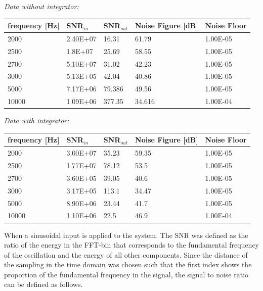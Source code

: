 \textit{Data without integrator:}
\begin{center}
\begin{tabular}{|m{3cm}|m{3cm}|m{2.5cm}|m{3.2cm}|m{2cm}|} 
\hline
frequency [Hz]& SNR$_{in}$ & SNR$_{out}$ & Noise Figure [dB] & Noise Floor \\ 
\hline \hline
2000 & 2.40E+07 & 16.31 & \cellcolor{blue!25}61.79 & 1.00E-05 \\ 
\hline
2500 & 1.8E+07 & 25.69 & \cellcolor{blue!25}58.55 & 1.00E-05 \\ 
\hline
2700 & 5.10E+07 & 31.02 & \cellcolor{blue!25}42.23 & 1.00E-05 \\ 
\hline
3000 & 5.13E+05 & 42.04 & \cellcolor{blue!25}40.86 & 1.00E-05 \\ 
\hline
5000 & 7.17E+06 & 79.386 & \cellcolor{blue!25}49.56 & 1.00E-05 \\ 
\hline
10000 & 1.09E+06 & 377.35 & \cellcolor{red!25}34.616 & 1.00E-04 \\ 
\hline

\end{tabular}
\end{center}

\textit{Data with integrator:}
\begin{center}
\begin{tabular}{|m{3cm}|m{3cm}|m{2.5cm}|m{3.2cm}|m{2cm}|} 
\hline
frequency [Hz]& SNR$_{in}$ & SNR$_{out}$ & Noise Figure [dB] & Noise Floor \\ 
\hline \hline
2000 & 3.00E+07 & 35.23 & \cellcolor{blue!25}59.35 & 1.00E-05 \\ 
\hline
2500 & 1.77E+07 & 78.12 & \cellcolor{blue!25}53.5 & 1.00E-05 \\ 
\hline
2700 & 3.60E+05 & 39.05 & \cellcolor{blue!25}40.6 & 1.00E-05 \\ 
\hline
3000 & 3.17E+05 & 113.1 & \cellcolor{blue!25}34.47 & 1.00E-05 \\ 
\hline
5000 & 8.90E+06 & 23.44 & \cellcolor{blue!25}41.7 & 1.00E-05 \\ 
\hline
10000 & 1.10E+06 & 22.5 & \cellcolor{red!25}46.9 & 1.00E-04 \\ 
\hline

\end{tabular}

\end{center}
When a sinusoidal input is applied to the system. The SNR was defined as the ratio of the energy in the FFT-bin that corresponds
to the fundamental frequency of the oscillation and the energy of all other components. Since the distance of the sampling in the time domain was chosen
such that the first index shows the proportion of the fundamental frequency in the signal, the signal to
noise ratio can be defined as follows.


